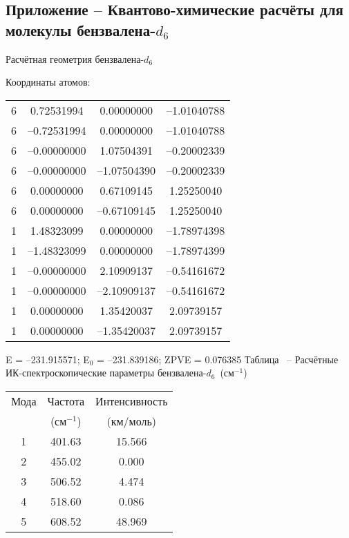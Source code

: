 {\begin{center}
\begin{tabular}{ccc}
\end{tabular}
\end{center}
\newpage
\subsection*{Приложение    -- Квантово-химические расчёты для молекулы бензвалена-$d_6$}
Расчётная геометрия бензвалена-$d_6$

Координаты атомов:
\begin{center}
\begin{tabular}{cccc}
6  &   0.72531994  & 0.00000000 & --1.01040788\\
   6 &   --0.72531994 &  0.00000000 & --1.01040788\\
   6 &   --0.00000000 &  1.07504391 & --0.20002339\\
   6 &   --0.00000000 & --1.07504390 & --0.20002339\\
   6 &    0.00000000 &  0.67109145 &  1.25250040\\
   6 &    0.00000000 & --0.67109145 &  1.25250040\\
   1 &    1.48323099 &  0.00000000 & --1.78974398\\
   1 &   --1.48323099 &  0.00000000 & --1.78974399\\
   1 &   --0.00000000 &  2.10909137 & --0.54161672\\
   1 &   --0.00000000 & --2.10909137 & --0.54161672\\
   1 &    0.00000000 &  1.35420037 &  2.09739157\\
   1 &    0.00000000 & --1.35420037 &  2.09739157\\
\end{tabular}
\end{center}
E =  --231.915571;    E$_0$ =  --231.839186;	ZPVE = 0.076385
\newpage {}
Таблица \thet\, -- Расчётные ИК-спектроскопические параметры бензвалена-$d_6$~(см$^{-1}$)
\begin{center}
\begin{tabular}{ccc}
Мода & Частота   & Интенсивность \\
&(см$^{-1}$)&(км/моль)\\
\hline
     1 &  401.63 &    15.566 \\
     2 &  455.02 &     0.000 \\
     3 &  506.52 &     4.474 \\
     4 &  518.60 &     0.086 \\
     5 &  608.52 &    48.969 \\

\end{tabular}
\end{center}}
